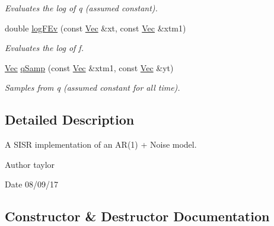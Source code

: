 \begin{DoxyCompactItemize}
\begin{DoxyCompactList}\small\item\em Evaluates the log of q (assumed constant). \end{DoxyCompactList}\item 
double \hyperlink{classNAr1Filter_adff7d17aa5271b8df4c77d752a6fd773}{log\+F\+Ev} (const \hyperlink{pmfs_8h_a4c7df05c6f5e8a0d15ae14bcdbc07152}{Vec} \&xt, const \hyperlink{pmfs_8h_a4c7df05c6f5e8a0d15ae14bcdbc07152}{Vec} \&xtm1)
\begin{DoxyCompactList}\small\item\em Evaluates the log of f. \end{DoxyCompactList}\item 
\hyperlink{pmfs_8h_a4c7df05c6f5e8a0d15ae14bcdbc07152}{Vec} \hyperlink{classNAr1Filter_af4f7f8b643e5750dc83e27ea7bf05f18}{q\+Samp} (const \hyperlink{pmfs_8h_a4c7df05c6f5e8a0d15ae14bcdbc07152}{Vec} \&xtm1, const \hyperlink{pmfs_8h_a4c7df05c6f5e8a0d15ae14bcdbc07152}{Vec} \&yt)
\begin{DoxyCompactList}\small\item\em Samples from q (assumed constant for all time). \end{DoxyCompactList}\end{DoxyCompactItemize}


\subsection{Detailed Description}
A S\+I\+SR implementation of an A\+R(1) + Noise model. 

\begin{DoxyAuthor}{Author}
taylor 
\end{DoxyAuthor}
\begin{DoxyDate}{Date}
08/09/17 
\end{DoxyDate}


\subsection{Constructor \& Destructor Documentation}
